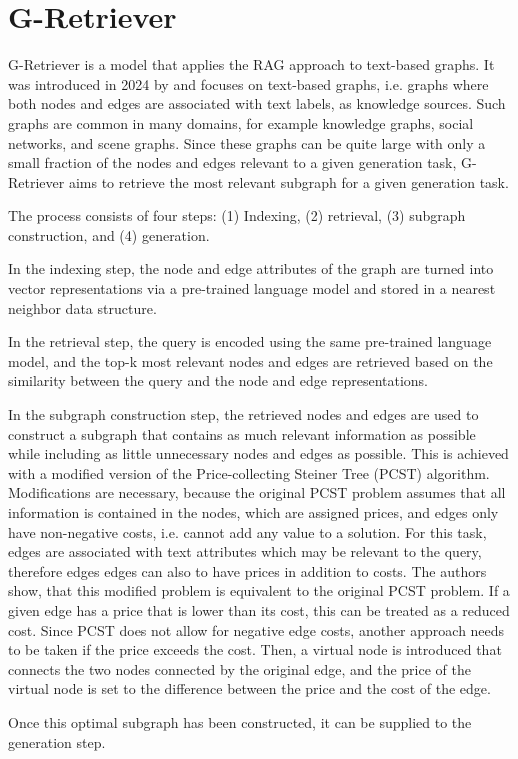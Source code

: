 \section{G-Retriever}

G-Retriever is a model that applies the RAG approach to text-based graphs.
It was introduced in 2024 by \cite{g-retriever} and focuses on text-based graphs, i.e. graphs where both nodes and edges are associated with text labels, as knowledge sources.
Such graphs are common in many domains, for example knowledge graphs, social networks, and scene graphs.
Since these graphs can be quite large with only a small fraction of the nodes and edges relevant to a given generation task, G-Retriever aims to retrieve the most relevant subgraph for a given generation task.

The process consists of four steps: (1) Indexing, (2) retrieval, (3) subgraph construction, and (4) generation.

In the indexing step, the node and edge attributes of the graph are turned into vector representations via a pre-trained language model and stored in a nearest neighbor data structure.

In the retrieval step, the query is encoded using the same pre-trained language model, and the top-k most relevant nodes and edges are retrieved based on the similarity between the query and the node and edge representations.

In the subgraph construction step, the retrieved nodes and edges are used to construct a subgraph that contains as much relevant information as possible while including as little unnecessary nodes and edges as possible.
This is achieved with a modified version of the Price-collecting Steiner Tree (PCST) algorithm.
Modifications are necessary, because the original PCST problem assumes that all information is contained in the nodes, which are assigned prices, and edges only have non-negative costs, i.e. cannot add any value to a solution.
For this task, edges are associated with text attributes which may be relevant to the query, therefore edges edges can also to have prices in addition to costs.
The authors show, that this modified problem is equivalent to the original PCST problem.
If a given edge has a price that is lower than its cost, this can be treated as a reduced cost.
Since PCST does not allow for negative edge costs, another approach needs to be taken if the price exceeds the cost.
Then, a virtual node is introduced that connects the two nodes connected by the original edge, and the price of the virtual node is set to the difference between the price and the cost of the edge.

Once this optimal subgraph has been constructed, it can be supplied to the generation step.